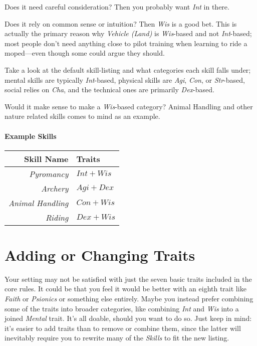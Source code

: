 Does it need careful consideration? Then you probably want \textit{Int} in there.

Does it rely on common sense or intuition? Then \textit{Wis} is a good bet.
This is actually the primary reason why \textit{Vehicle (Land)} is \textit{Wis}-based and not \textit{Int}-based; most people don't need anything close to pilot training when learning to ride a moped---even though some could argue they should.

Take a look at the default skill-listing and what categories each skill falls under; mental skills are typically \textit{Int}-based, physical skills are \textit{Agi}, \textit{Con}, or \textit{Str}-based, social relies on \textit{Cha}, and the technical ones are primarily \textit{Dex}-based.

Would it make sense to make a \textit{Wis}-based category? Animal Handling and other nature related skills comes to mind as an example.

\paragraph{Example Skills}
\begin{center}
\begin{tabular}{r|l}
    \textbf{Skill Name}      & \textbf{Traits}\\\hline
    \textit{Pyromancy}       & $Int + Wis$\\
    \textit{Archery}         & $Agi + Dex$\\
    \textit{Animal Handling} & $Con + Wis$\\
    \textit{Riding}          & $Dex + Wis$\\
\end{tabular}
\end{center}

\section{Adding or Changing Traits}
Your setting may not be satisfied with just the seven basic traits included in the core rules.
It could be that you feel it would be better with an eighth trait like \textit{Faith} or \textit{Psionics} or something else entirely.
Maybe you instead prefer combining some of the traits into broader categories, like combining \textit{Int} and \textit{Wis} into a joined \textit{Mental} trait.
It's all doable, should you want to do so.
Just keep in mind: it's easier to add traits than to remove or combine them, since the latter will inevitably require you to rewrite many of the \textit{Skills} to fit the new listing.

